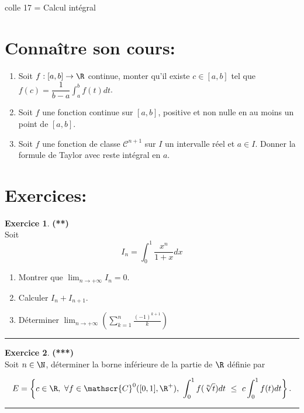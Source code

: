 \documentclass[a4paper,11pt]{article}
\theoremstyle{definition}
\newtheorem{exo}{Exercice} %
\begin{document}
	
	
	\begin{center}
		\Large \sc colle 17 = Calcul intégral
	\end{center}
\raggedright


\section*{Connaître son cours:}
\begin{enumerate}
	\item Soit $f : [a , b ] \to \R$ continue, monter qu’il existe $c \in [a , b ]$ tel que
	$\displaystyle f(c) = \dfrac{1}{b-a} \int_{a}^{b} f(t)dt$. 
	\item Soit $f$ une fonction continue sur $[a , b ] $, positive et non nulle en au moins un point de $[a , b ] $.
	\item Soit $f$ une fonction de classe $\mathcal C^{n+1}$ sur $I$ un intervalle réel et $a \in I $. Donner la formule de Taylor avec reste intégral en $a$.
\end{enumerate}

\section*{Exercices:} 	


\begin{exo}\textbf{(**)}\quad\\[0.2cm]
	Soit $$\displaystyle I_{n} = \int_0^1 \frac{x^n}{1 + x}d x$$
	\begin{enumerate}
		\item Montrer que $\displaystyle \lim_{n\to +\infty} I_{n}=0$.
		\item  Calculer $\displaystyle I_n + I_{n + 1}$.
		\item D\'eterminer $\displaystyle \lim_{n \rightarrow  + \infty} \left(\sum_{k = 1}^n \frac{(-1)^{k + 1}}k\right)$
	\end{enumerate}	
	
	\centering\rule{1\linewidth}{0.6pt}\end{exo}
	
\begin{exo}\textbf{(***)}\quad\\[0.25cm]
	
	Soit $n\in\N$, déterminer la borne inférieure de la partie de $\R$ définie par
	
	$$\displaystyle E= \left\{c \in \R, \  \forall f \in  \mathscr{C}^0 ([0, 1], \R^+ ), \ 
	\int_{0}^{1}f (\sqrt[n]{t}) dt \ \leq \ c \int_{0}^{1}f (t) dt\right\}.$$
	
	\centering
	\rule{1\linewidth}{0.6pt}
\end{exo}
\end{document}
